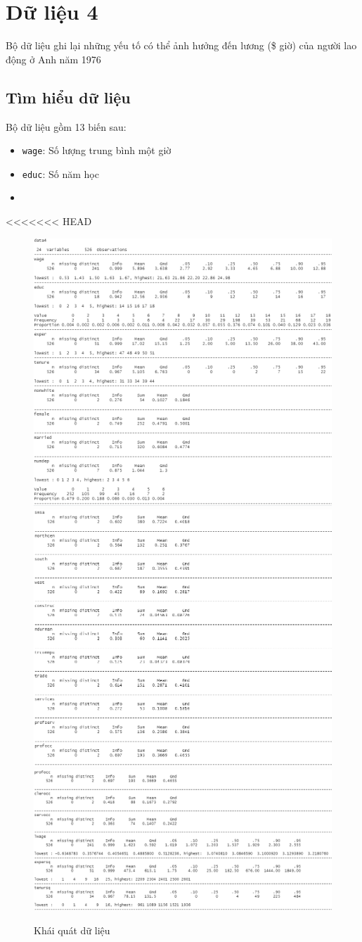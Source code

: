 
\section{Dữ liệu 4}
Bộ dữ liệu ghi lại những yếu tố có thể ảnh hưởng đến lương (\$ giờ) của người lao động ở Anh năm 1976

\subsection*{Tìm hiểu dữ liệu}
Bộ dữ liệu gồm 13 biến sau:
\begin{itemize}
	\item \texttt{wage}: Số lượng trung bình một giờ
	\item \texttt{educ}: Số năm học
	\item 
\end{itemize}

<<<<<<< HEAD
\begin{figure}
	\centering
	{\includegraphics[width=0.63\linewidth]{../Photo Of Result/describe(4)-1}}
	{\includegraphics[width=0.63\linewidth]{../Photo Of Result/describe(4)-2}}
	{\includegraphics[width=0.63\linewidth]{../Photo Of Result/describe(4)-3}}
	\caption{Khái quát dữ liệu}
	\label{describe-4}
\end{figure}

